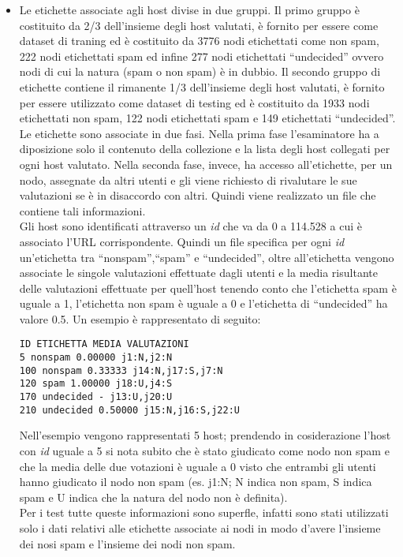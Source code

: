 \begin{itemize}
 \item Le etichette associate agli host divise in due gruppi. Il primo gruppo è costituito da 2/3 dell'insieme degli host valutati, è fornito per essere come dataset di traning ed è costituito da 3776 nodi etichettati come non spam, 222 nodi etichettati spam ed infine 277 nodi etichettati ``undecided'' ovvero nodi di cui la natura (spam o non spam) è in dubbio. Il secondo gruppo di etichette contiene il rimanente 1/3 dell'insieme degli host valutati, è fornito per essere utilizzato come dataset di testing ed è costituito da 1933 nodi etichettati non spam, 122 nodi etichettati spam e 149 etichettati ``undecided''.\\
 Le etichette sono associate in due fasi. Nella prima fase l'esaminatore ha a diposizione solo il contenuto della collezione e la lista degli host collegati per ogni host valutato. Nella seconda fase, invece, ha accesso all'etichette, per un nodo, assegnate da altri utenti e gli viene richiesto di rivalutare le sue valutazioni se è in disaccordo con altri. Quindi viene realizzato un file che contiene tali informazioni.\\ 
 Gli host sono identificati attraverso un \textit{id} che va da 0 a 114.528 a cui è associato l'URL corrispondente. Quindi un file specifica per ogni \textit{id} un'etichetta tra ``nonspam'',``spam'' e ``undecided'', oltre all'etichetta vengono associate le singole valutazioni effettuate dagli utenti e la media risultante delle valutazioni effettuate per quell'host tenendo conto che l'etichetta spam è uguale a 1, l'etichetta non spam è uguale a 0 e l'etichetta di ``undecided'' ha valore 0.5. Un esempio è rappresentato di seguito: 
 \begin{lstlisting}[frame=trbl,postbreak=\space, breakindent=5pt, breaklines]
ID ETICHETTA MEDIA VALUTAZIONI
5 nonspam 0.00000 j1:N,j2:N
100 nonspam 0.33333 j14:N,j17:S,j7:N
120 spam 1.00000 j18:U,j4:S
170 undecided - j13:U,j20:U
210 undecided 0.50000 j15:N,j16:S,j22:U
\end{lstlisting}
Nell'esempio vengono rappresentati 5 host; prendendo in cosiderazione l'host con \textit{id} uguale a 5 si nota subito che è stato giudicato come nodo non spam e che la media delle due votazioni è uguale a 0 visto che entrambi gli utenti hanno giudicato il nodo non spam (es. j1:N; N indica non spam, S indica spam e U indica che la natura del nodo non è definita).\\ 
Per i test tutte queste informazioni sono superfle, infatti sono stati utilizzati solo i dati relativi alle etichette associate ai nodi in modo d'avere l'insieme dei nosi spam e l'insieme dei nodi non spam.


\end{itemize}
